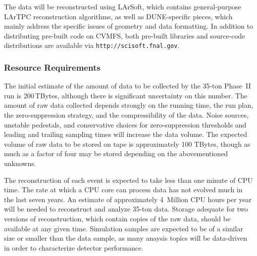 The data will be reconstructed using LArSoft, which contains general-purpose LArTPC reconstruction algorithms,
as well as DUNE-specific pieces, which mainly address the specific issues of geometry and data formatting.
In addition to distributing pre-built code on CVMFS, both pre-built libraries and source-code distributions
are available via {\tt http://scisoft.fnal.gov}.


\subsubsection{Resource Requirements}
\label{sec:35t-resource-requirements}
The initial estimate of the amount of data to be collected by the 35-ton Phase~II run is 200\,TBytes,
although there is significant uncertainty on this number.  The amount of raw data collected
depends strongly on the running time, the run plan, the zero-suppression strategy, and the
compressibility of the data.  Noise sources, unstable pedestals, and conservative choices for zero-suppression
thresholds and leading and trailing sampling times will increase the data volume.
The expected volume of raw data to be stored on tape is approximately 100 TBytes, though as much as a factor
of four may be stored depending on the abovementioned unknowns.

The reconstruction of each event is expected to take less than one minute of CPU time.  The rate at which
a CPU core can process data has not evolved much in the last seven years.  An estimate of approximately
4~Million CPU hours per year will be needed to reconstruct and analyze 35-ton data.  Storage adequate for
two versions of reconstruction, which contain copies of the raw data, should be available at any given time.
Simulation samples are expected to be of a similar size or smaller than the data sample, as many anaysis
topics will be data-driven in order to characterize detector performance.
